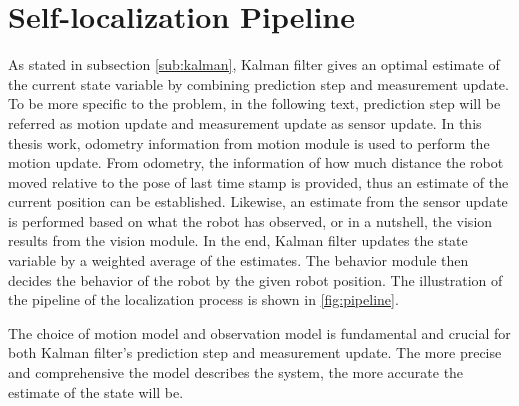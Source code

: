 \chapter{Self-localization Pipeline\label{cha:chapter4}}


As stated in subsection \ref{sub:kalman}, Kalman filter gives an optimal estimate of the current state variable by combining prediction step and measurement update. To be more specific to the problem, in the following text, prediction step will be referred as motion update and measurement update as sensor update. In this thesis work, odometry information from motion module is used to perform the motion update. From odometry, the information of how much distance the robot moved relative to the pose of last time stamp is provided, thus an estimate of the current position can be established. Likewise, an estimate from the sensor update is performed based on what the robot has observed, or in a nutshell, the vision results from the vision module. In the end, Kalman filter updates the state variable by a weighted average of the estimates. The behavior module then decides the behavior of the robot by the given robot position. The illustration of the pipeline of the localization process is shown in \autoref{fig:pipeline}.

The choice of motion model and observation model is fundamental and crucial for both Kalman filter's prediction step and measurement update. The more precise and comprehensive the model describes the system, the more accurate the estimate of the state will be. 

